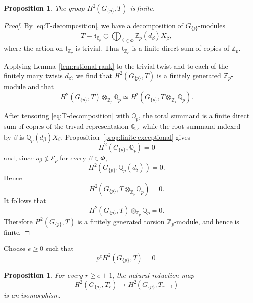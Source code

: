 \documentclass[11pt]{amsart}
\numberwithin{equation}{section}
\newcommand{\Qp}{\mathbb Q_p}
\newcommand{\Zp}{\mathbb Z_p}
\newcommand{\cE}{\mathcal E}
\newcommand{\frakt}{\mathfrak t}
\newtheorem{proposition}[theorem]{Proposition}
\theoremstyle{definition}
\begin{document}
\begin{proposition}\label{prop:H2-finite}
The group $H^2(G_{\{p\}},T)$ is finite.
\end{proposition}

\begin{proof}
By \eqref{eq:T-decomposition}, we have a decomposition of
$G_{\{p\}}$-modules
\[
        T
        =
        \frakt_{\Zp}
        \oplus
        \bigoplus_{\beta\in\Phi}
        \Zp(d_\beta)X_\beta,
\]
where the action on $\frakt_{\Zp}$ is trivial. Thus
$\frakt_{\Zp}$ is a finite direct sum of copies of $\Zp$.

Applying Lemma~\ref{lem:rational-rank} to the trivial twist and to
each of the finitely many twists $d_\beta$, we find that
$H^2(G_{\{p\}},T)$ is a finitely generated $\Zp$-module and that
\[
        H^2(G_{\{p\}},T)\otimes_{\Zp}\Qp
        \simeq
        H^2\!\left(G_{\{p\}},T\otimes_{\Zp}\Qp\right).
\]

After tensoring \eqref{eq:T-decomposition} with $\Qp$, the toral
summand is a finite direct sum of copies of the trivial representation
$\Qp$, while the root summand indexed by $\beta$ is
$\Qp(d_\beta)X_\beta$. Proposition~\ref{prop:finite-exceptional}
gives
\[
        H^2(G_{\{p\}},\Qp)=0
\]
and, since $d_\beta\notin\cE_p$ for every $\beta\in\Phi$,
\[
        H^2(G_{\{p\}},\Qp(d_\beta))=0.
\]
Hence
\[
        H^2\!\left(
        G_{\{p\}},T\otimes_{\Zp}\Qp
        \right)=0.
\]
It follows that
\[
        H^2(G_{\{p\}},T)\otimes_{\Zp}\Qp=0.
\]
Therefore $H^2(G_{\{p\}},T)$ is a finitely generated torsion
$\Zp$-module, and hence is finite.
\end{proof}

Choose $e\ge0$ such that
\begin{equation}\label{eq:e-kills-H2}
        p^e H^2(G_{\{p\}},T)=0.
\end{equation}

\begin{proposition}\label{prop:H2-stability}
For every $r\ge e+1$, the natural reduction map
\[
 H^2(G_{\{p\}},T_r)
 \longrightarrow
 H^2(G_{\{p\}},T_{r-1})
\]
is an isomorphism.
\end{proposition}
\end{document}
